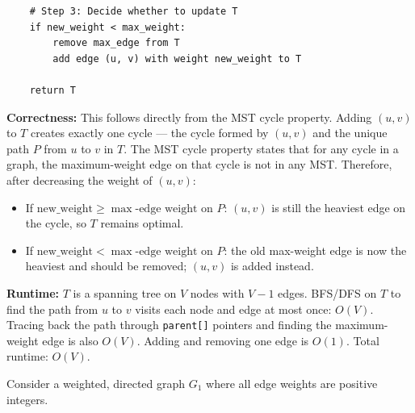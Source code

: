 \documentclass[addpoints]{exam}
\begin{document}
\begin{questions}
\begin{verbatim}
    # Step 3: Decide whether to update T
    if new_weight < max_weight:
        remove max_edge from T
        add edge (u, v) with weight new_weight to T

    return T
\end{verbatim}

\textbf{Correctness:} This follows directly from the MST cycle property. Adding $(u,v)$ to $T$ creates exactly one cycle — the cycle formed by $(u,v)$ and the unique path $P$ from $u$ to $v$ in $T$. The MST cycle property states that for any cycle in a graph, the maximum-weight edge on that cycle is not in any MST. Therefore, after decreasing the weight of $(u,v)$:
\begin{itemize}
  \item If $\text{new\_weight} \geq \max\text{-edge weight on } P$: $(u,v)$ is still the heaviest edge on the cycle, so $T$ remains optimal.
  \item If $\text{new\_weight} < \max\text{-edge weight on } P$: the old max-weight edge is now the heaviest and should be removed; $(u,v)$ is added instead.
\end{itemize}

\textbf{Runtime:} $T$ is a spanning tree on $V$ nodes with $V-1$ edges. BFS/DFS on $T$ to find the path from $u$ to $v$ visits each node and edge at most once: $O(V)$. Tracing back the path through \texttt{parent[]} pointers and finding the maximum-weight edge is also $O(V)$. Adding and removing one edge is $O(1)$. Total runtime: $O(V)$.


\question Consider a weighted, directed graph $G_1$ where all edge weights are positive integers.

\end{questions}
\end{document}
